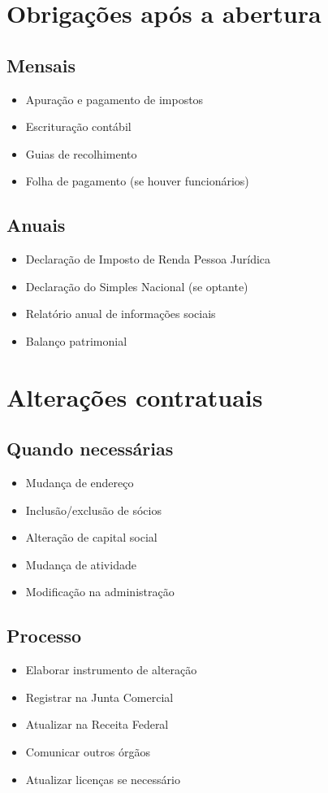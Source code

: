 \documentclass[12pt,a4paper]{article}
\begin{document}
\section{Obrigações após a abertura}

\subsection{Mensais}
\begin{itemize}
    \item Apuração e pagamento de impostos
    \item Escrituração contábil
    \item Guias de recolhimento
    \item Folha de pagamento (se houver funcionários)
\end{itemize}

\subsection{Anuais}
\begin{itemize}
    \item Declaração de Imposto de Renda Pessoa Jurídica
    \item Declaração do Simples Nacional (se optante)
    \item Relatório anual de informações sociais
    \item Balanço patrimonial
\end{itemize}

\section{Alterações contratuais}

\subsection{Quando necessárias}
\begin{itemize}
    \item Mudança de endereço
    \item Inclusão/exclusão de sócios
    \item Alteração de capital social
    \item Mudança de atividade
    \item Modificação na administração
\end{itemize}

\subsection{Processo}
\begin{itemize}
    \item Elaborar instrumento de alteração
    \item Registrar na Junta Comercial
    \item Atualizar na Receita Federal
    \item Comunicar outros órgãos
    \item Atualizar licenças se necessário
\end{itemize}
\end{document}
